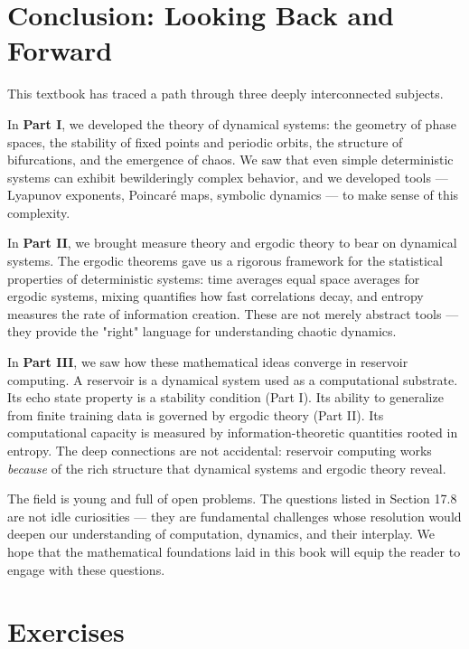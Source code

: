 \bigskip


\section{Conclusion: Looking Back and Forward}\label{sec:17.9}

This textbook has traced a path through three deeply interconnected subjects.

In \textbf{Part I}, we developed the theory of dynamical systems: the geometry of phase spaces, the stability of fixed points and periodic orbits, the structure of bifurcations, and the emergence of chaos. We saw that even simple deterministic systems can exhibit bewilderingly complex behavior, and we developed tools --- Lyapunov exponents, Poincaré maps, symbolic dynamics --- to make sense of this complexity.

In \textbf{Part II}, we brought measure theory and ergodic theory to bear on dynamical systems. The ergodic theorems gave us a rigorous framework for the statistical properties of deterministic systems: time averages equal space averages for ergodic systems, mixing quantifies how fast correlations decay, and entropy measures the rate of information creation. These are not merely abstract tools --- they provide the "right" language for understanding chaotic dynamics.

In \textbf{Part III}, we saw how these mathematical ideas converge in reservoir computing. A reservoir is a dynamical system used as a computational substrate. Its echo state property is a stability condition (Part I). Its ability to generalize from finite training data is governed by ergodic theory (Part II). Its computational capacity is measured by information-theoretic quantities rooted in entropy. The deep connections are not accidental: reservoir computing works \textit{because} of the rich structure that dynamical systems and ergodic theory reveal.

The field is young and full of open problems. The questions listed in Section 17.8 are not idle curiosities --- they are fundamental challenges whose resolution would deepen our understanding of computation, dynamics, and their interplay. We hope that the mathematical foundations laid in this book will equip the reader to engage with these questions.


\bigskip


\section*{Exercises}

